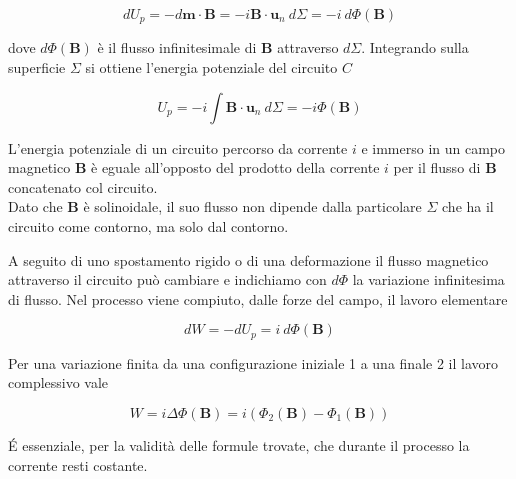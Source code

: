 \begin{equation*}
    d U_p = - d \mathbf{m} \cdot \mathbf{B} = - i \mathbf{B} \cdot \mathbf{u}_n \ d \Sigma = -i \ d\Phi (\mathbf{B})
\end{equation*}

dove $d \Phi (\mathbf{B})$ è il flusso infinitesimale di $\mathbf{B}$ attraverso $d \Sigma$. Integrando sulla superficie $\Sigma$ si ottiene l'energia potenziale del circuito $C$

\begin{tcolorbox}[colback=yellow!10!white, colframe=orange!70!black, boxrule=0.8pt]
\begin{equation}
    U_p = -i \int \mathbf{B} \cdot \mathbf{u}_n \ d \Sigma = -i \Phi (\mathbf{B})
\end{equation}
\end{tcolorbox}

L'energia potenziale di un circuito percorso da corrente $i$ e immerso in un campo magnetico $\mathbf{B}$ è eguale all'opposto del prodotto della corrente $i$ per il flusso di $\mathbf{B}$ concatenato col circuito.\\

Dato che $\mathbf{B}$ è solinoidale, il suo flusso non dipende dalla particolare $\Sigma$ che ha il circuito come contorno, ma solo dal contorno. 

A seguito di uno spostamento rigido o di una deformazione il flusso magnetico attraverso il circuito può cambiare e indichiamo con $d \Phi$ la variazione infinitesima di flusso. 
Nel processo viene compiuto, dalle forze del campo, il lavoro elementare

\begin{equation}
    dW = - dU_p = i \ d \Phi (\mathbf{B})
\end{equation}

Per una variazione finita da una configurazione iniziale 1 a una finale 2 il lavoro complessivo vale 

\begin{tcolorbox}[colback=yellow!10!white, colframe=orange!70!black, boxrule=0.8pt]
\begin{equation}
    W = i \Delta \Phi (\mathbf{B}) = i (\Phi_2 (\mathbf{B}) - \Phi_1 (\mathbf{B}))
\end{equation}
\end{tcolorbox}

\'E essenziale, per la validità delle formule trovate, che durante il processo la corrente resti costante.\\

